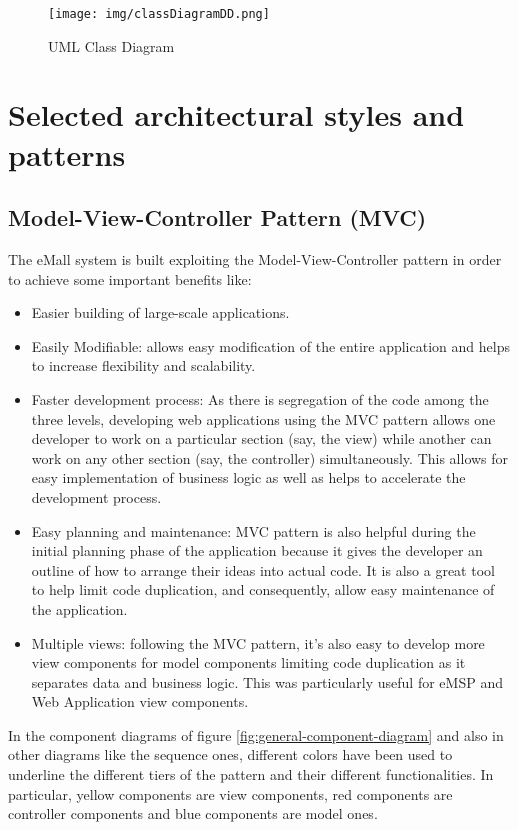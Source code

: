 \documentclass[a4paper]{report}
\begin{document}
\begin{figure}[htp]
\texttt{[image: img/classDiagramDD.png]}
\caption{UML Class Diagram}
\label{fig:classDiagram}
\end{figure}
\restoregeometry

\section{Selected architectural styles and patterns}

\subsection{Model-View-Controller Pattern (MVC)}
The eMall system is built exploiting the Model-View-Controller pattern in order to achieve some important benefits like:
\begin{itemize}
    \item Easier building of large-scale applications.
    \item Easily Modifiable: allows easy modification of the entire application and helps to increase flexibility and scalability.
    \item Faster development process: As there is segregation of the code among the three levels, developing web applications using the MVC pattern allows one developer to work on a particular section (say, the view) while another can work on any other section (say, the controller) simultaneously. This allows for easy implementation of business logic as well as helps to accelerate the development process.
    \item Easy planning and maintenance: MVC pattern is also helpful during the initial planning phase of the application because it gives the developer an outline of how to arrange their ideas into actual code. It is also a great tool to help limit code duplication, and consequently, allow easy maintenance of the application.
    \item Multiple views: following the MVC pattern, it's also easy to develop more view components for model components limiting code duplication as it separates data and business logic. This was particularly useful for eMSP and Web Application view components.
\end{itemize}
In the component diagrams of figure \ref{fig:general-component-diagram} and also in other diagrams like the sequence ones, different colors have been used to underline the different tiers of the pattern and their different functionalities. In particular, yellow components are view components, red components are controller components and blue components are model ones.
\end{document}
